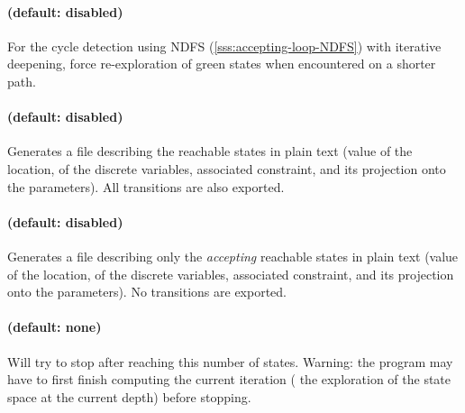 \paragraph{ (default: disabled)}
For the cycle detection using NDFS (\cref{sss:accepting-loop-NDFS}) with iterative deepening, force re-exploration of
green states when encountered on a shorter path.




\paragraph{ (default: disabled)}
Generates a file  describing the reachable states in plain text (value of the location, of the discrete variables, associated constraint, and its projection onto the parameters).
All transitions are also exported.


\paragraph{ (default: disabled)}
Generates a file  describing only the \emph{accepting} reachable states in plain text (value of the location, of the discrete variables, associated constraint, and its projection onto the parameters).
No transitions are exported.



\paragraph{ (default: none)}
Will try to stop after reaching this number of states.
Warning: the program may have to first finish computing the current iteration (\ie{} the exploration of the state space at the current depth) before stopping.


